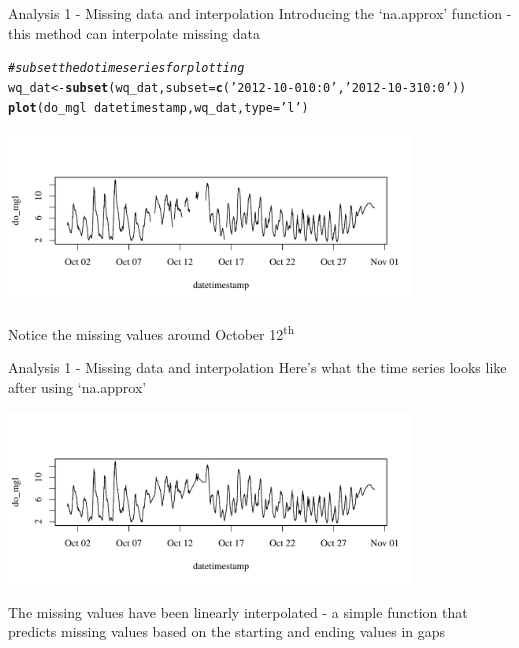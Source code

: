 \documentclass[xcolor=svgnames]{beamer}\usepackage[]{graphicx}\usepackage[]{color}
\makeatletter
\newcommand{\hlstr}[1]{\textcolor[rgb]{0.192,0.494,0.8}{#1}}%
\newcommand{\hlcom}[1]{\textcolor[rgb]{0.678,0.584,0.686}{\textit{#1}}}%
\newcommand{\hlopt}[1]{\textcolor[rgb]{0,0,0}{#1}}%
\newcommand{\hlstd}[1]{\textcolor[rgb]{0.345,0.345,0.345}{#1}}%
\newcommand{\hlkwb}[1]{\textcolor[rgb]{0.69,0.353,0.396}{#1}}%
\newcommand{\hlkwc}[1]{\textcolor[rgb]{0.333,0.667,0.333}{#1}}%
\newcommand{\hlkwd}[1]{\textcolor[rgb]{0.737,0.353,0.396}{\textbf{#1}}}%
\newenvironment{kframe}{%
 \def\at@end@of@kframe{}%
 \ifinner\ifhmode%
  \def\at@end@of@kframe{\end{minipage}}%
  \begin{minipage}{\columnwidth}%
 \fi\fi%
 \def\FrameCommand##1{\hskip\@totalleftmargin \hskip-\fboxsep
 \colorbox{shadecolor}{##1}\hskip-\fboxsep
     \hskip-\linewidth \hskip-\@totalleftmargin \hskip\columnwidth}%
 \MakeFramed {\advance\hsize-\width
   \@totalleftmargin\z@ \linewidth\hsize
   \@setminipage}}%
 {\par\unskip\endMakeFramed%
 \at@end@of@kframe}
\newenvironment{knitrout}{}{} %
\makeatother
\begin{document}
\begin{frame}[containsverbatim]{Analysis 1 - Missing data and interpolation}
Introducing the `na.approx' function - this method can interpolate missing data
\begin{knitrout}\scriptsize
{}\color{fgcolor}\begin{kframe}
\begin{alltt}
\hlcom{# subset the do time series for plotting}
\hlstd{wq_dat} \hlkwb{<-} \hlkwd{subset}\hlstd{(wq_dat,} \hlkwc{subset} \hlstd{=} \hlkwd{c}\hlstd{(}\hlstr{'2012-10-01 0:0'}\hlstd{,} \hlstr{'2012-10-31 0:0'}\hlstd{))}
\hlkwd{plot}\hlstd{(do_mgl} \hlopt{~} \hlstd{datetimestamp, wq_dat,} \hlkwc{type} \hlstd{=} \hlstr{'l'}\hlstd{)}
\end{alltt}
\end{kframe}

{\centering \includegraphics[width=0.8\textwidth]{figure/unnamed-chunk-4} 

}



\end{knitrout}
Notice the missing values around October 12\textsuperscript{th}
\end{frame}

\begin{frame}[containsverbatim]{Analysis 1 - Missing data and interpolation}
Here's what the time series looks like after using `na.approx'
\begin{knitrout}\scriptsize
{}\color{fgcolor}

{\centering \includegraphics[width=0.8\textwidth]{figure/unnamed-chunk-5} 

}



\end{knitrout}
The missing values have been linearly interpolated - a simple function that predicts missing values based on the starting and ending values in gaps
\end{frame}
\end{document}
